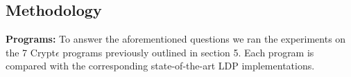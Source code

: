 \subsection{Methodology} 
\textbf{Programs:}
To answer the aforementioned questions we ran the experiments on the 7 Crypt$\epsilon$ programs previously outlined in section 5. Each program is compared with the corresponding state-of-the-art \textsf{LDP} implementations.%
